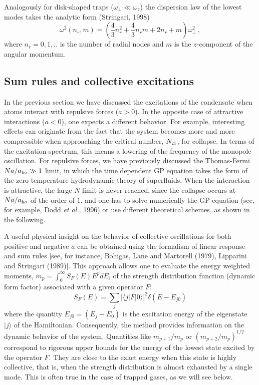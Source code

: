 Analogously for disk-shaped traps ($\omega_{\perp}\ll\omega_z$) the 
dispersion law of the lowest modes takes the analytic form (Stringari, 1998)
\begin{equation}
\omega^2(n_r,m) = \left( \frac{4}{3}n_r^2+\frac{4}{3}n_rm+2n_r+m \right)
\omega_{\perp}^2
\, ,
\label{eq:omegadisk}
\end{equation}
where $n_r=0,1,..$ is the number of radial nodes and $m$ is the $z$-component 
of the angular momentum.

 
\subsection{Sum rules and collective excitations}
\label{sec:collectivewithanegative}


In the previous section we have discussed the excitations of the 
condensate when atoms interact with repulsive forces ($a>0$). 
In the opposite case of attractive interactions ($a<0$), one expects 
a different behavior. For example, interesting effects can originate
from the fact that the system becomes more and more compressible
when approaching the critical number, $N_{\rm cr}$, for collapse. 
In terms of the excitation spectrum, this means a lowering of the
frequency of the monopole oscillation. For repulsive forces, we
have previously discussed the Thomas-Fermi $Na/a_{\rm ho}\gg 1$ 
limit, in which the time dependent GP equation takes the form 
of the zero temperature hydrodynamic theory of superfluids. When the 
interaction is attractive, the large $N$ limit is never reached, 
since the collapse occurs at $Na/a_{\rm ho}$ of the order of $1$,
and one has to solve numerically the GP equation (see, for example, 
Dodd {\it et al.}, 1996) or use different theoretical schemes,
as shown in the following.

A useful physical insight on the behavior of collective oscillations
for both positive and negative $a$ can be obtained using the 
formalism of linear response and sum rules [see, for instance,
Bohigas, Lane and Martorell (1979), Lipparini and Stringari (1989)]. 
This approach allows one to evaluate the energy weighted moments, 
$m_p= \int_0^{\infty} S_F(E)E^p dE$, of the strength distribution 
function (dynamic form factor) associated with a given operator $F$:
\begin{equation}
S_F(E) = \sum_j | \langle j | F |0 \rangle |^2
\delta(E-E_{j0})
\label{eq:SF}
\end{equation}
where the quantity $E_{j0}= (E_j-E_0)$ is the excitation energy of the
eigenstate $|j\rangle$ of the Hamiltonian. Consequently, the method 
provides information on the dynamic behavior of the system. Quantities
like $m_{p+1}/m_p$ or $(m_{p+2}/m_p)^{1/2}$ correspond to rigorous 
upper bounds for the energy of the lowest state excited by the 
operator $F$. They are close to the exact energy when this state
is highly collective, that is, when the strength distribution is
almost exhausted by a single mode. This is often true in the case 
of trapped gases, as we will see below.  

